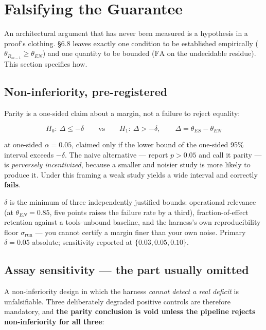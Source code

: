 \section{Falsifying the Guarantee}
\label{sec:falsifying-the-guarantee}

An architectural argument that has never been measured is a hypothesis in a proof's
clothing. \S6.8 leaves exactly one condition to be established empirically
($\theta_{R_{m-1}} \ge \theta_{EN}$) and one quantity to be bounded ($\mathrm{FA}$ on
the undecidable residue). This section specifies how.

\subsection{Non-inferiority, pre-registered}
\label{sec:non-inferiority-pre-registered}

Parity is a one-sided claim about a margin, not a failure to reject equality:

\begin{equation}
\label{eq:non-inferiority-hypothesis}
H_0:\ \Delta \le -\delta
\qquad\text{vs}\qquad
H_1:\ \Delta > -\delta,
\qquad \Delta = \theta_{ES} - \theta_{EN}
\end{equation}

at one-sided $\alpha = 0.05$, claimed only if the lower bound of the one-sided 95\%
interval exceeds $-\delta$. The naive alternative --- report $p > 0.05$ and call it
parity --- is \emph{perversely incentivized}, because a smaller and noisier study is
more likely to produce it. Under this framing a weak study yields a wide interval and
correctly \textbf{fails}.

$\delta$ is the minimum of three independently justified bounds: operational relevance
(at $\theta_{EN}=0.85$, five points raises the failure rate by a third),
fraction-of-effect retention against a tools-unbound baseline, and the harness's own
reproducibility floor $\sigma_{\text{run}}$ --- you cannot certify a margin finer than
your own noise. Primary $\delta = 0.05$ absolute; sensitivity reported at
$\{0.03, 0.05, 0.10\}$.

\subsection{Assay sensitivity --- the part usually omitted}
\label{sec:assay-sensitivity}

A non-inferiority design in which the harness \emph{cannot detect a real deficit} is
unfalsifiable. Three deliberately degraded positive controls are therefore mandatory,
and \textbf{the parity conclusion is void unless the pipeline rejects non-inferiority
for all three}:

